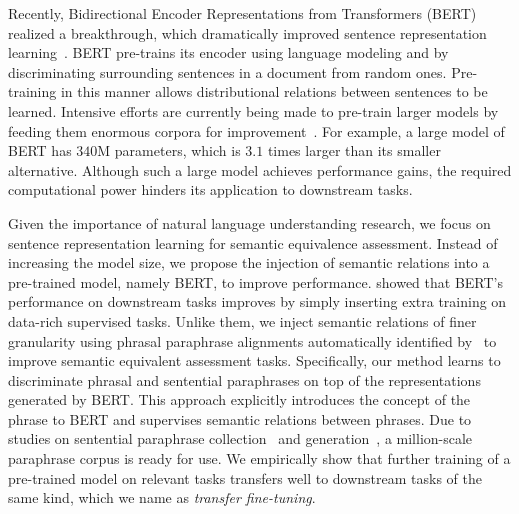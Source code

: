\documentclass[11pt,a4paper]{article}
\begin{document}
Recently, Bidirectional Encoder Representations from Transformers (BERT) realized a breakthrough, which dramatically improved sentence representation learning~\cite{bert}.
BERT pre-trains its encoder using language modeling and by discriminating surrounding sentences in a document from random ones. 
Pre-training in this manner allows distributional relations between sentences to be learned. 
Intensive efforts are currently being made to pre-train larger models by feeding them enormous corpora for improvement~\cite{opeai-gpt2,xlnet}. 
For example, a large model of BERT has $340$M parameters, which is $3.1$ times larger than its smaller alternative. 
Although such a large model achieves performance gains, the required computational power hinders its application to downstream tasks.


Given the importance of natural language understanding research, we focus on sentence representation learning for semantic equivalence assessment. 
Instead of increasing the model size, we propose the injection of semantic relations into a pre-trained model, namely BERT, to improve performance. %
 showed that BERT's performance on downstream tasks improves by simply inserting extra training on data-rich supervised tasks. 
Unlike them, we inject semantic relations of finer granularity using phrasal paraphrase alignments automatically identified by~ to improve semantic equivalent assessment tasks. 
Specifically, our method learns to discriminate phrasal and sentential paraphrases on top of the representations generated by BERT.  
This approach explicitly introduces the concept of the phrase to BERT and supervises semantic relations between phrases. 
Due to studies on sentential paraphrase collection~\cite{D17-1126} and generation~\cite{P18-1042}, a million-scale paraphrase corpus is ready for use.  
We empirically show that further training of a pre-trained model on relevant tasks transfers well to downstream tasks of the same kind, which we name as {\em transfer fine-tuning}. 
\end{document}
